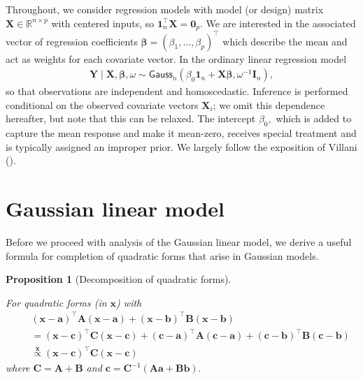 \documentclass[
  11pt,
  letterpaper,
]{scrbook}
\theoremstyle{plain}
\theoremstyle{plain}
\newtheorem{proposition}{Proposition}[chapter]
\theoremstyle{plain}
\theoremstyle{definition}
\theoremstyle{definition}
\theoremstyle{definition}
\theoremstyle{remark}
\begin{document}
Throughout, we consider regression models with model (or design) matrix
\(\mathbf{X} \in \mathbb{R}^{n \times p}\) with centered inputs, so
\(\mathbf{1}_n^\top\mathbf{X}=\mathbf{0}_p.\) We are interested in the
associated vector of regression coefficients
\(\boldsymbol{\beta} = (\beta_1, \ldots, \beta_p)^\top\) which describe
the mean and act as weights for each covariate vector. In the ordinary
linear regression model \begin{align*}
\boldsymbol{Y} \mid \mathbf{X}, \boldsymbol{\beta}, \omega \sim \mathsf{Gauss}_n(\beta_0\mathbf{1}_n + \mathbf{X}\boldsymbol{\beta}, \omega^{-1}\mathbf{I}_n),
\end{align*} so that observations are independent and homoscedastic.
Inference is performed conditional on the observed covariate vectors
\(\mathbf{X}_i\); we omit this dependence hereafter, but note that this
can be relaxed. The intercept \(\beta_0,\) which is added to capture the
mean response and make it mean-zero, receives special treatment and is
typically assigned an improper prior. We largely follow the exposition
of Villani ().

\section{Gaussian linear model}\label{gaussian-linear-model}

Before we proceed with analysis of the Gaussian linear model, we derive
a useful formula for completion of quadratic forms that arise in
Gaussian models.

\begin{proposition}[Decomposition of quadratic
forms]\protect\hypertarget{prp-quadratic-forms}{}\label{prp-quadratic-forms}

For quadratic forms (in \(\boldsymbol{x}\)) with \begin{align*}
& (\boldsymbol{x} - \boldsymbol{a})^\top \mathbf{A}(\boldsymbol{x} - \boldsymbol{a}) + (\boldsymbol{x} - \boldsymbol{b})^\top \mathbf{B}(\boldsymbol{x} - \boldsymbol{b}) \\\quad &=
 (\boldsymbol{x} - \boldsymbol{c})^\top \mathbf{C}(\boldsymbol{x} - \boldsymbol{c}) + (\boldsymbol{c}-\boldsymbol{a})^\top\mathbf{A}(\boldsymbol{c}-\boldsymbol{a}) + (\boldsymbol{c}-\boldsymbol{b})^\top\mathbf{B}(\boldsymbol{c}-\boldsymbol{b})\\
&\stackrel{\boldsymbol{x}}{\propto} (\boldsymbol{x} - \boldsymbol{c})^\top \mathbf{C}(\boldsymbol{x} - \boldsymbol{c})
\end{align*} where \(\mathbf{C} = \mathbf{A} + \mathbf{B}\) and
\(\boldsymbol{c}= \mathbf{C}^{-1}(\mathbf{A}\boldsymbol{a} + \mathbf{B}\boldsymbol{b}).\)

\end{proposition}
\end{document}
